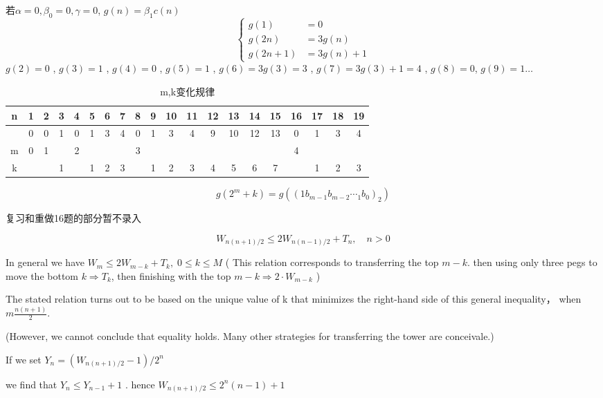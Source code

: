 \begin{answer}
若$ \alpha=0,\beta_0=0, \gamma=0 $, $ g(n)=\beta_1 c(n) $  
\begin{equation*}
	\left\{
		\begin{aligned}
			g(1)&=0\\
			g(2n)&=3g(n)\\
			g(2n+1)&=3g(n)+1
		\end{aligned}
	\right.
\end{equation*}
$ g(2)=0 $ , $ g(3)=1 $ , $ g(4)=0 $ , $ g(5)=1 $ , 
$ g(6)=3g(3)=3 $ , $ g(7)=3g(3)+1=4 $ , $ g(8)=0 $, $ g(9)=1 \dots$  

\begin{table}[htbp]
	\centering
	\small
	\caption{m,k变化规律}
	\begin{tabular}{c|ccccc ccccc ccccc cccc}
		\toprule
		n & 1 & 2 & 3 & 4 & 5 & 6 & 7 & 8 & 9 & 10 & 11 & 12 & 13 & 14 & 15 & 16 & 17 & 18 & 19 \\
		\midrule
		& 0 & 0 & 1 & 0 & 1 & 3 & 4 & 0 & 1 & 3  & 4  & 9  & 10 & 12 & 13 & 0  & 1  & 3  & 4  \\
		m & 0 & 1 &   & 2 &   &   &   & 3 &   &    &    &    &    &    & & 4  &    &    &    \\  
		k& &   & 1 &   & 1 & 2 & 3 &   & 1 & 2  & 3  & 4  & 5  & 6  & 7 &   & 1  & 2  & 3 \\
		\bottomrule
	\end{tabular}%
	\label{tab:EX16}%
\end{table}%
\begin{equation*}
	g(2^{m}+k)=g(\left( 1 b_{m-1}b_{m-2}\dotsb_1b_0 \right)_2)
\end{equation*}
\end{answer}

复习和重做16题的部分暂不录入


\begin{exercise} 
	\begin{equation*}
		W_{n(n+1)/2} \leqslant 2W_{n(n-1)/2}+T_n, \quad n>0
	\end{equation*}
\end{exercise}

\begin{answer}
	In general we have $ W_m\leqslant 2W_{m-k}+T_k, \; 0\leqslant k \leqslant M $ 
( This relation corresponds to transferring the top $ m-k $. 
then using only three pegs to move the bottom $ k\Rightarrow T_k $, then finishing with the top $ m-k \Rightarrow 2\cdot W_{m-k} $ )

The stated relation turns out to be based on the unique value of k that minimizes the right-hand side of this general inequality， when $ m\frac{n(n+1)}{2} $.

(However, we cannot conclude that equality holds. Many other
strategies for transferring the tower are conceivale.)

If we set $ Y_n = (W_{n(n+1)/2}-1)/2^n $ 

we find that $ Y_n \leqslant Y_{n-1}+1 $ . 
hence $ W_{n(n+1)/2} \leqslant 2^n(n-1)+1 $ 
\end{answer}

